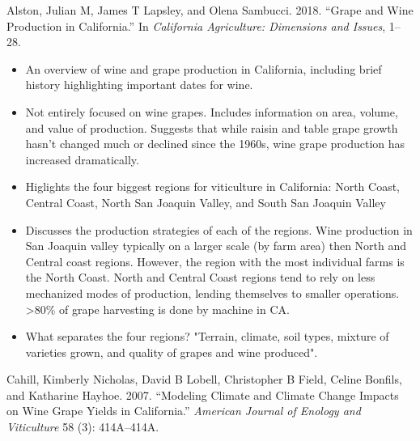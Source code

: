 \newpage

\hypertarget{refs}{}
\hypertarget{ref-alston2018}{}
Alston, Julian M, James T Lapsley, and Olena Sambucci. 2018. ``Grape and
Wine Production in California.'' In \emph{California Agriculture:
Dimensions and Issues}, 1--28.

\begin{itemize}
\tightlist
  \item
    An overview of wine and grape production in California, including brief history highlighting important dates for wine.
  \item
    Not entirely focused on wine grapes. Includes information on area, volume, and value of production. Suggests that while raisin and table grape growth hasn't changed much or declined since the 1960s, wine grape production has increased dramatically. 
  \item
    Higlights the four biggest regions for viticulture in California: North Coast, Central Coast, North San Joaquin Valley, and South San Joaquin Valley
  \item
    Discusses the production strategies of each of the regions. Wine production in San Joaquin valley typically on a larger scale (by farm area) then North and Central coast regions. However, the region with the most individual farms is the North Coast. North and Central Coast regions tend to rely on less mechanized modes of production, lending themselves to smaller operations. >80\% of grape harvesting is done by machine in CA.
  \item
    What separates the four regions? "Terrain, climate, soil types, mixture of varieties grown, and quality of grapes and wine produced".
\end{itemize}

\hypertarget{ref-cahill2007}{}
Cahill, Kimberly Nicholas, David B Lobell, Christopher B Field, Celine
Bonfils, and Katharine Hayhoe. 2007. ``Modeling Climate and Climate
Change Impacts on Wine Grape Yields in California.'' \emph{American
Journal of Enology and Viticulture} 58 (3): 414A--414A.

